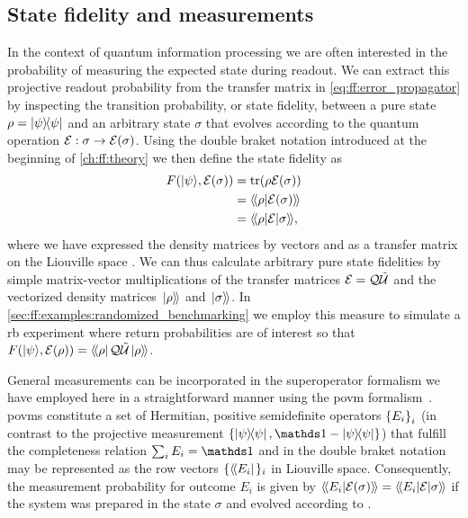 \subsection{State fidelity and measurements}\label{subsec:ff:theory:derived_quantities:state_fidelity-measurements}
In the context of quantum information processing we are often interested in the probability of measuring the expected state during readout.
We can extract this projective readout probability from the transfer matrix in \cref{eq:ff:error_propagator} by inspecting the transition probability, or state fidelity, between a pure state $\rho = \op{\psi}$ and an arbitrary state $\sigma$ that evolves according to the quantum operation $\mathcal{E}: \sigma\rightarrow\mathcal{E}(\sigma)$.
Using the double braket notation introduced at the beginning of \cref{ch:ff:theory} we then define the state fidelity as
\begin{equation}\label{eq:ff:fidelity:state}
    \begin{split}
        \fid(\kpsi, \qp(\sigma)) &= \tr(\rho\qp(\sigma)) \\
                                 &= \dip{\rho}{\qp(\sigma)} \\
                                 & =  \dmel{\rho}{\qp}{\sigma},
    \end{split}
\end{equation}
where we have expressed the density matrices by vectors and \qp as a transfer matrix on the Liouville space \Lspace.
We can thus calculate arbitrary pure state fidelities by simple matrix-vector multiplications of the transfer matrices $\mathcal{E} = \mathcal{Q}\mathcal{\tilde{U}}$ and the vectorized density matrices $\mbox{\ensuremath{\left.\ket{\rho}\!\right\rangle}}$ and $\mbox{\ensuremath{\left.\ket{\sigma}\!\right\rangle}}$.
In \cref{sec:ff:examples:randomized_benchmarking} we employ this measure to simulate a \gls{rb} experiment where return probabilities are of interest so that $F(\mbox{\ensuremath{\ket{\psi}}}, \mathcal{E}(\rho)) = \mbox{\ensuremath{\left\langle\!\bra{\rho}\right.}}\mathcal{Q}\mathcal{\tilde{U}}\mbox{\ensuremath{\left.\ket{\rho}\!\right\rangle}}$.

General measurements can be incorporated in the superoperator formalism we have employed here in a straightforward manner using the \gls{povm} formalism~\cite{Wallman2014,Greenbaum2015}.
\Glspl{povm} constitute a set of Hermitian, positive semidefinite operators $\left\lbrace {E}_{i}\right\rbrace_{i}$ (in contrast to the projective measurement $\lbrace\op{\psi}{\psi},\eye - \op{\psi}{\psi}\rbrace$) that fulfill the completeness relation $\sum_i E_i = \eye$ and in the double braket notation may be represented as the row vectors $\lbrace\mbox{\ensuremath{\left\langle\!\bra{E_i}\right.}}\rbrace_i$ in Liouville space.
Consequently, the measurement probability for outcome $E_i$ is given by $\dip{E_i}{\qp(\sigma)} = \dmel{E_i}{\qp}{\sigma}$ if the system was prepared in the state $\sigma$ and evolved according to \qp.

